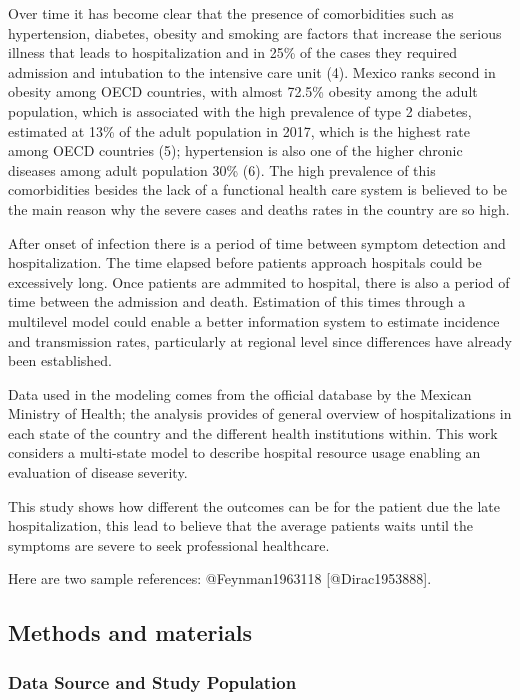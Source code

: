 \documentclass[
]{article}
\begin{document}
Over time it has become clear that the presence of comorbidities such as
hypertension, diabetes, obesity and smoking are factors that increase
the serious illness that leads to hospitalization and in 25\% of the
cases they required admission and intubation to the intensive care unit
(4). Mexico ranks second in obesity among OECD countries, with almost
72.5\% obesity among the adult population, which is associated with the
high prevalence of type 2 diabetes, estimated at 13\% of the adult
population in 2017, which is the highest rate among OECD countries (5);
hypertension is also one of the higher chronic diseases among adult
population 30\% (6). The high prevalence of this comorbidities besides
the lack of a functional health care system is believed to be the main
reason why the severe cases and deaths rates in the country are so high.

After onset of infection there is a period of time between symptom
detection and hospitalization. The time elapsed before patients approach
hospitals could be excessively long. Once patients are admmited to
hospital, there is also a period of time between the admission and
death. Estimation of this times through a multilevel model could enable
a better information system to estimate incidence and transmission
rates, particularly at regional level since differences have already
been established.

Data used in the modeling comes from the official database by the
Mexican Ministry of Health; the analysis provides of general overview of
hospitalizations in each state of the country and the different health
institutions within. This work considers a multi-state model to describe
hospital resource usage enabling an evaluation of disease severity.

This study shows how different the outcomes can be for the patient due
the late hospitalization, this lead to believe that the average patients
waits until the symptoms are severe to seek professional healthcare.

Here are two sample references: @Feynman1963118 {[}@Dirac1953888{]}.

\hypertarget{methods-and-materials}{%
\subsection{Methods and materials}\label{methods-and-materials}}

\hypertarget{data-source-and-study-population}{%
\subsubsection{Data Source and Study
Population}\label{data-source-and-study-population}}
\end{document}
